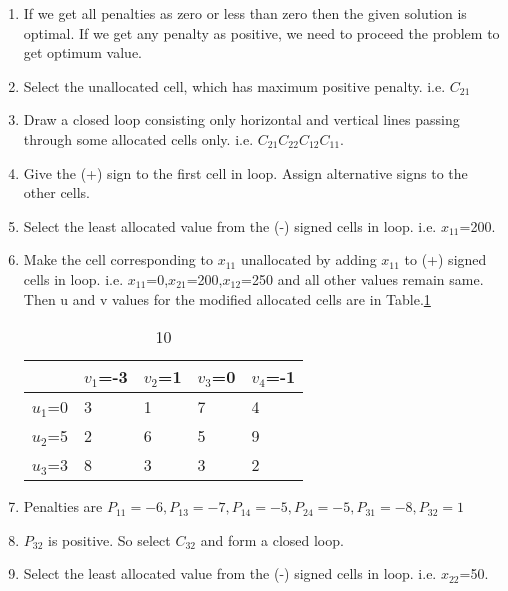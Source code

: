 \documentclass[journal,12pt,twocolumn]{IEEEtran}
\begin{document}
\begin{enumerate}[1.]
\item
If we get all penalties as zero or less than zero then the given solution is optimal. If we get any penalty as positive, we need to proceed the problem to get optimum value.

\item Select the unallocated cell, which has maximum positive penalty. i.e. $C_{21}$

\item Draw a closed loop consisting only horizontal and vertical lines passing through some allocated cells only. i.e. $C_{21}C_{22}C_{12}C_{11}$.

\item Give the (+) sign to the first cell in loop. Assign alternative signs to the other cells.

\item Select the least allocated value from the (-) signed cells in loop. i.e. $x_{11}$=200.

\item Make the cell corresponding to $x_{11}$ unallocated by adding $x_{11}$ to (+) signed cells in loop. i.e. $x_{11}$=0,$x_{21}$=200,$x_{12}$=250 and all other values remain same. Then u and v values for the modified allocated cells are in Table.\ref{table10}

\begin{table}[!h]
\begin{center}
\begin{tabular}{| l | l | l | l | l | }
                 \hline
                   & $v_1$=-3 & $v_2$=1 & $v_3$=0 & $v_4$=-1  \\
\hline
$u_1$=0 & 3 & 1 & 7 & 4  \\ \hline
$u_2$=5 & 2 & 6 & 5 & 9   \\ \hline
$u_3$=3 & 8 & 3 & 3 & 2  \\ \hline

\end{tabular}
\end{center}
\caption{10}
\label{table10}
\end{table}

\item Penalties are
$
P_{11}=-6,
P_{13}=-7,
P_{14}=-5,
P_{24}=-5,
P_{31}=-8,
P_{32}=1
$

\item 
$P_{32}$ is positive. So select $C_{32}$ and form a closed loop.
\item 
Select the least allocated value from the (-) signed cells in loop. i.e. $x_{22}$=50.


\end{enumerate}
\end{document}
